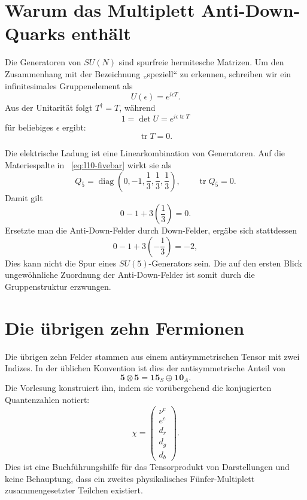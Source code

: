 \section{Warum das Multiplett Anti-Down-Quarks enthält}

Die Generatoren von \(SU(N)\) sind spurfreie hermitesche Matrizen. Um den Zusammenhang mit der Bezeichnung „speziell“ zu erkennen, schreiben wir ein infinitesimales Gruppenelement als
\begin{equation}
U(\epsilon)=e^{i\epsilon T}.
\end{equation}
Aus der Unitarität folgt \(T^\dagger=T\), während
\begin{equation}
1=\det U=e^{i\epsilon\operatorname{tr}T}
\end{equation}
für beliebiges \(\epsilon\) ergibt:
\begin{equation}
\operatorname{tr}T=0.
\label{eq:l10-traceless-generator}
\end{equation}

Die elektrische Ladung ist eine Linearkombination von Generatoren. Auf die Materiespalte in ~\eqref{eq:l10-fivebar} wirkt sie als
\begin{equation}
Q_{\overline5}
=
\operatorname{diag}
\left(0,-1,\frac13,\frac13,\frac13\right),
\qquad
\operatorname{tr}Q_{\overline5}=0.
\label{eq:l10-charge-fivebar}
\end{equation}
Damit gilt
\begin{equation}
0-1+3\left(\frac13\right)=0.
\end{equation}
Ersetzte man die Anti-Down-Felder durch Down-Felder, ergäbe sich stattdessen
\begin{equation}
0-1+3\left(-\frac13\right)=-2,
\end{equation}
Dies kann nicht die Spur eines \(SU(5)\)-Generators sein. Die auf den ersten Blick ungewöhnliche Zuordnung der Anti-Down-Felder ist somit durch die Gruppenstruktur erzwungen.

\section{Die übrigen zehn Fermionen}

Die übrigen zehn Felder stammen aus einem antisymmetrischen Tensor mit zwei Indizes. In der üblichen Konvention ist dies der antisymmetrische Anteil von
\begin{equation}
\mathbf5\otimes\mathbf5
=\mathbf{15}_S\oplus\mathbf{10}_A.
\label{eq:l10-five-five}
\end{equation}
Die Vorlesung konstruiert ihn, indem sie vorübergehend die konjugierten Quantenzahlen notiert:
\begin{equation}
\chi=
\begin{pmatrix}
\nu^c\\
e^c\\
d_r\\
d_g\\
d_b
\end{pmatrix}.
\label{eq:l10-aux-five}
\end{equation}
Dies ist eine Buchführungshilfe für das Tensorprodukt von Darstellungen und keine Behauptung, dass ein zweites physikalisches Fünfer-Multiplett zusammengesetzter Teilchen existiert.

